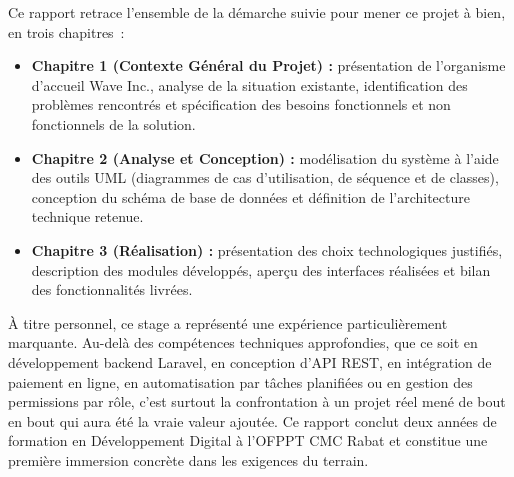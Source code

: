 \documentclass[12pt, a4paper]{report}
\newcommand{\ofppt}{\textsc{OFPPT}}
\begin{document}
\vspace{0.6cm}

Ce rapport retrace l'ensemble de la démarche suivie pour mener ce projet
à bien, en trois chapitres~:

\vspace{0.4cm}

\begin{itemize}
  \item \textbf{Chapitre 1 (Contexte Général du Projet) :} présentation
  de l'organisme d'accueil Wave Inc., analyse de la situation existante,
  identification des problèmes rencontrés et spécification des besoins
  fonctionnels et non fonctionnels de la solution.

  \item \textbf{Chapitre 2 (Analyse et Conception) :} modélisation du
  système à l'aide des outils UML (diagrammes de cas d'utilisation, de
  séquence et de classes), conception du schéma de base de données et
  définition de l'architecture technique retenue.

  \item \textbf{Chapitre 3 (Réalisation) :} présentation des choix
  technologiques justifiés, description des modules développés, aperçu
  des interfaces réalisées et bilan des fonctionnalités livrées.
\end{itemize}

\vspace{0.6cm}

À titre personnel, ce stage a représenté une expérience particulièrement
marquante. Au-delà des compétences techniques approfondies, que ce soit
en développement backend Laravel, en conception d'API REST, en intégration
de paiement en ligne, en automatisation par tâches planifiées ou en gestion
des permissions par rôle, c'est surtout la confrontation à un projet réel
mené de bout en bout qui aura été la vraie valeur ajoutée. Ce rapport
conclut deux années de formation en Développement Digital à l'\ofppt{}
CMC Rabat et constitue une première immersion concrète dans les exigences
du terrain.

%  
 
 

\clearpage
\thispagestyle{empty} %
\end{document}
